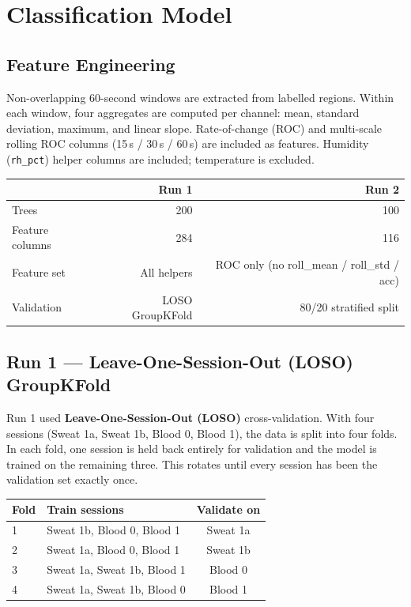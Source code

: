 \documentclass[11pt,a4paper]{article}
\begin{document}
\section{Classification Model}

\subsection{Feature Engineering}

Non-overlapping 60-second windows are extracted from labelled regions.
Within each window, four aggregates are computed per channel:
mean, standard deviation, maximum, and linear slope.
Rate-of-change (ROC) and multi-scale rolling ROC columns (15\,s / 30\,s / 60\,s)
are included as features.  Humidity (\texttt{rh\_pct}) helper columns are
included; temperature is excluded.

\begin{center}
\begin{tabular}{lrr}
\toprule
& Run 1 & Run 2 \\
\midrule
Trees            & 200   & 100 \\
Feature columns  & 284   & 116 \\
Feature set      & All helpers & ROC only (no roll\_mean / roll\_std / acc) \\
Validation       & LOSO GroupKFold & 80/20 stratified split \\
\bottomrule
\end{tabular}
\end{center}

\subsection{Run 1 --- Leave-One-Session-Out (LOSO) GroupKFold}

Run 1 used \textbf{Leave-One-Session-Out (LOSO)} cross-validation.
With four sessions (Sweat 1a, Sweat 1b, Blood 0, Blood 1), the data is split
into four folds.  In each fold, one session is held back entirely for
validation and the model is trained on the remaining three.  This rotates
until every session has been the validation set exactly once.

\begin{center}
\begin{tabular}{llc}
\toprule
Fold & Train sessions & Validate on \\
\midrule
1 & Sweat 1b, Blood 0, Blood 1 & Sweat 1a \\
2 & Sweat 1a, Blood 0, Blood 1 & Sweat 1b \\
3 & Sweat 1a, Sweat 1b, Blood 1 & Blood 0 \\
4 & Sweat 1a, Sweat 1b, Blood 0 & Blood 1 \\
\bottomrule
\end{tabular}
\end{center}
\end{document}
